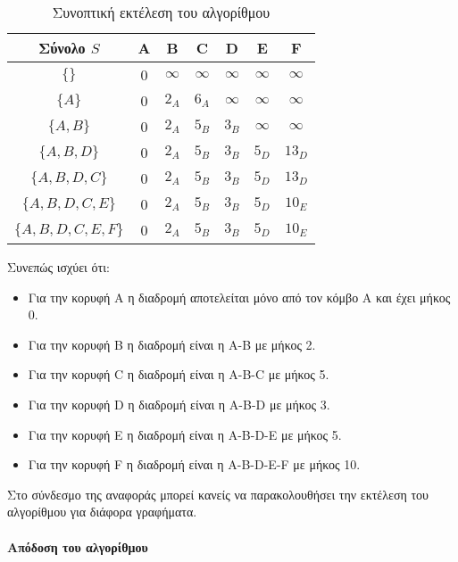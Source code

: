\begin{table}[ht]
	\centering
	\label{tbl:dijkstra2}
	\begin{tabular}{|c|c|c|c|c|c|c|}
		\hline
		Σύνολο $S$  & A & B        & C        & D        & E        & F        \\ \hline
		$\{\}$            & 0 & $\infty$     & $\infty$ & $\infty$ & $\infty$ & $\infty$ \\ \hline
		$\{A\}$           & 0 & $2_A$        & $6_A$        & $\infty$ & $\infty$ & $\infty$ \\ \hline
		$\{A,B\}$         & 0 & $2_A$        & $5_B$        & $3_B$        & $\infty$ & $\infty$ \\ \hline
		$\{A,B,D\}$       & 0 & $2_A$        & $5_B$        & $3_B$        & $5_D$        & $13_D$       \\ \hline
		$\{A,B,D,C\}$     & 0 & $2_A$        & $5_B$        & $3_B$        & $5_D$        & $13_D$       \\ \hline
		$\{A,B,D,C,E\}$   & 0 & $2_A$        & $5_B$        & $3_B$        & $5_D$        & $10_E$       \\ \hline
		$\{A,B,D,C,E,F\}$ & 0 & $2_A$        & $5_B$        & $3_B$        & $5_D$        & $10_E$       \\ \hline
	\end{tabular}
	\caption{Συνοπτική εκτέλεση του αλγορίθμου}
\end{table}

Συνεπώς ισχύει ότι: 
\begin{itemize}[noitemsep]
	\item Για την κορυφή A η διαδρομή αποτελείται μόνο από τον κόμβο A και έχει μήκος 0.
	\item Για την κορυφή B η διαδρομή είναι η A-B με μήκος 2.
	\item Για την κορυφή C η διαδρομή είναι η A-B-C με μήκος 5.
	\item Για την κορυφή D η διαδρομή είναι η A-B-D με μήκος 3.
	\item Για την κορυφή E η διαδρομή είναι η A-B-D-E με μήκος 5.
	\item Για την κορυφή F η διαδρομή είναι η A-B-D-E-F με μήκος 10.
\end{itemize}

Στο σύνδεσμο της αναφοράς \cite{algorithm_visualization_dijkstra} μπορεί κανείς να παρακολουθήσει την εκτέλεση του αλγορίθμου για διάφορα γραφήματα.

\paragraph{Απόδοση του αλγορίθμου}

